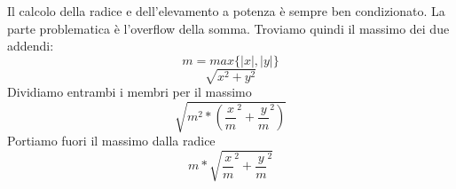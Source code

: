 Il calcolo della radice e dell'elevamento a potenza è sempre ben condizionato.  La parte problematica è l'overflow della somma.
Troviamo quindi il massimo dei due addendi:\\
\begin{equation}
m = max\{|x|,|y|\} 
\end{equation}
\begin{equation}
\sqrt{x^2 + y^2}
\end{equation}
Dividiamo entrambi i membri per il massimo
\begin{equation}
\sqrt{m^2*(\frac{x}{m}^2 + \frac{y}{m}^2)}
\end{equation}
Portiamo fuori il massimo dalla radice
\begin{equation}
m*\sqrt{\frac{x}{m}^2 + \frac{y}{m}^2}
\end{equation}
